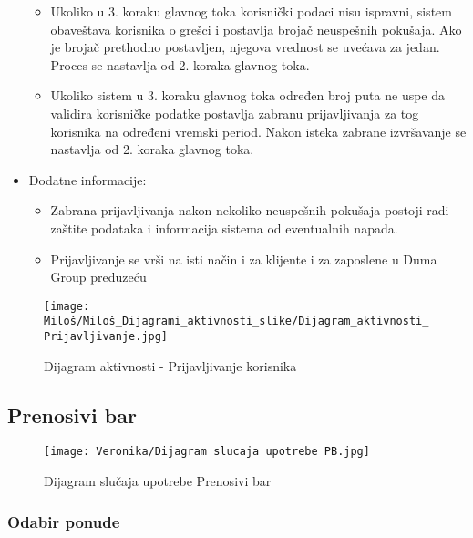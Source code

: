\documentclass[a4paper]{article}
\begin{document}
\begin{itemize}
\begin{itemize}
            \item Ukoliko u 3. koraku glavnog toka korisnički podaci nisu ispravni, sistem obaveštava korisnika o grešci i postavlja brojač neuspešnih pokušaja.
            Ako je brojač prethodno postavljen, njegova vrednost se uvećava za jedan. Proces se nastavlja od 2. koraka glavnog toka.
            \item Ukoliko sistem u 3. koraku glavnog toka određen broj puta ne uspe da validira korisničke podatke postavlja zabranu prijavljivanja za tog korisnika na određeni vremski period. Nakon isteka zabrane izvršavanje se nastavlja od 2. koraka glavnog toka.
        \end{itemize}
    \item Dodatne informacije:
        \begin{itemize}
            \item Zabrana prijavljivanja nakon nekoliko neuspešnih pokušaja postoji radi zaštite podataka i informacija sistema od eventualnih napada.
            \item Prijavljivanje se vrši na isti način i za klijente i za zaposlene u Duma Group preduzeću
        \end{itemize}
\end{itemize}


\begin{figure}[htp]
    \centering
    \texttt{[image: Miloš/Miloš\_Dijagrami\_aktivnosti\_slike/Dijagram\_aktivnosti\_Prijavljivanje.jpg]}
    \caption{Dijagram aktivnosti - Prijavljivanje korisnika}
    \label{fig:Prijavljivanje aktivnost}
\end{figure}



\subsection{Prenosivi bar}

\begin{figure}[H]
    \centering
    \texttt{[image: Veronika/Dijagram slucaja upotrebe PB.jpg]}
    \caption{Dijagram slučaja upotrebe Prenosivi bar}
    \label{fig:PrenosiviBar}
\end{figure}

\subsubsection{Odabir ponude}
\end{document}
